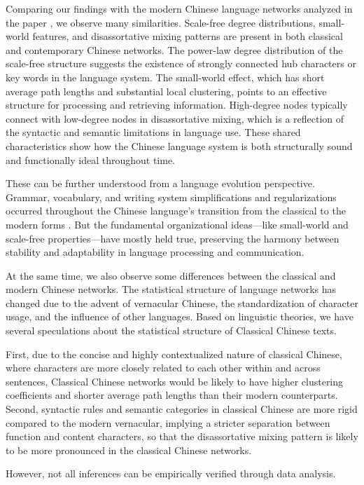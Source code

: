 \documentclass[11pt]{article}
\begin{document}
Comparing our findings with the modern Chinese language networks analyzed in the paper \cite{Li2007}, we observe many similarities.  Scale-free degree distributions, small-world features, and disassortative mixing patterns are present in both classical and contemporary Chinese networks. The power-law degree distribution of the scale-free structure suggests the existence of strongly connected hub characters or key words in the language system. The small-world effect, which has short average path lengths and substantial local clustering, points to an effective structure for processing and retrieving information. High-degree nodes typically connect with low-degree nodes in disassortative mixing, which is a reflection of the syntactic and semantic limitations in language use. These shared characteristics show how the Chinese language system is both structurally sound and functionally ideal throughout time.

These can be further understood from a language evolution perspective. Grammar, vocabulary, and writing system simplifications and regularizations occurred throughout the Chinese language's transition from the classical to the modern forms \cite{Chen1999}. But the fundamental organizational ideas—like small-world and scale-free properties—have mostly held true, preserving the harmony between stability and adaptability in language processing and communication.

At the same time, we also observe some differences between the classical and modern Chinese networks. The statistical structure of language networks has changed due to the advent of vernacular Chinese, the standardization of character usage, and the influence of other languages. Based on linguistic theories, we have several speculations about the statistical structure of Classical Chinese texts.

First, due to the concise and highly contextualized nature of classical Chinese, where characters are more closely related to each other within and across sentences, Classical Chinese networks would be likely to have higher clustering coefficients and shorter average path lengths than their modern counterparts. Second, syntactic rules and semantic categories in classical Chinese are more rigid compared to the modern vernacular,  implying a stricter separation between function and content characters, so that the disassortative mixing pattern is likely to be more pronounced in the classical Chinese networks. 

However, not all inferences can be empirically verified through data analysis.
\end{document}
